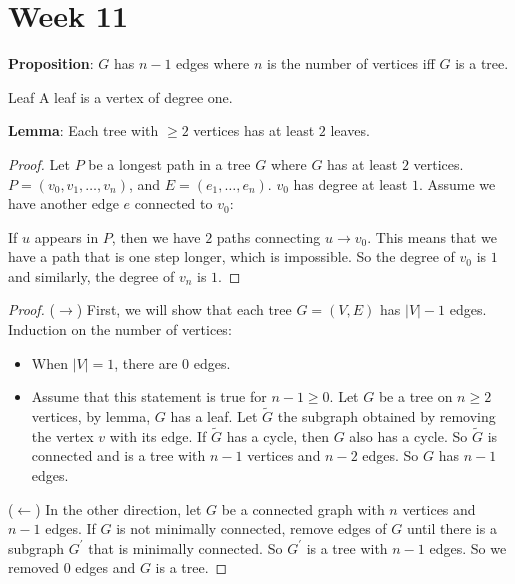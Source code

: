 \documentclass{report}
\begin{document}
\chapter{Week 11}

\textbf{Proposition}: $G$ has $n - 1$ edges where $n$ is the number of vertices iff $G$ is a tree.

\begin{definition}{Leaf}
    A leaf is a vertex of degree one.
\end{definition}

\textbf{Lemma}: Each tree with $\geq 2$ vertices has at least $2$ leaves.
    \begin{proof}
        Let $P$ be a longest path in a tree $G$ where $G$ has at least $2$ vertices. $P = (v_{0}, v_{1}, \ldots, v_{n})$, and $E = (e_{1}, \ldots, e_{n})$. $v_{0}$ has degree at least $1$. Assume we have another edge $e$ connected to $v_{0}$:
            \begin{center}
            \end{center}
        If $u$ appears in $P$, then we have $2$ paths connecting $u \rightarrow v_{0}$. This means that we have a path that is one step longer, which is impossible. So the degree of $v_{0}$ is $1$ and similarly, the degree of $v_{n}$ is $1$.
    \end{proof}

\begin{proof}
    ($\rightarrow$) First, we will show that each tree $G = (V, E)$ has $\lvert V \rvert - 1$ edges. Induction on the number of vertices:
        \begin{itemize}
            \item When $\lvert V \rvert = 1$, there are $0$ edges.

            \item Assume that this statement is true for $n - 1 \geq 0$. Let $G$ be a tree on $n \geq 2$ vertices, by lemma, $G$ has a leaf. Let $\tilde{G}$ the subgraph obtained by removing the vertex $v$ with its edge. If $\tilde{G}$ has a cycle, then $G$ also has a cycle. So $\tilde{G}$ is connected and is a tree with $n - 1$ vertices and $n - 2$ edges. So $G$ has $n - 1$ edges.
        \end{itemize}

    ($\leftarrow$) In the other direction, let $G$ be a connected graph with $n$ vertices and $n - 1$ edges. If $G$ is not minimally connected, remove edges of $G$ until there is a subgraph $G^{\prime}$ that is minimally connected. So $G^{\prime}$ is a tree with $n - 1$ edges. So we removed $0$ edges and $G$ is a tree.
\end{proof}
\end{document}
